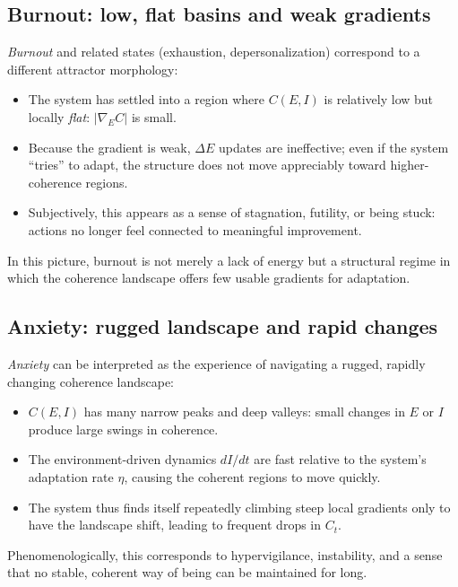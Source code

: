 \documentclass[12pt,a4paper]{report}
\begin{document}
\subsection*{Burnout: low, flat basins and weak gradients}

\emph{Burnout} and related states (exhaustion, depersonalization) correspond to a different attractor morphology:

\begin{itemize}[leftmargin=2em]
    \item The system has settled into a region where \(C(E, I)\) is relatively low but locally \emph{flat}: \(|\nabla_E C|\) is small.
    \item Because the gradient is weak, $\Delta E$ updates are ineffective; even if the system ``tries'' to adapt, the structure does not move appreciably toward higher-coherence regions.
    \item Subjectively, this appears as a sense of stagnation, futility, or being stuck: actions no longer feel connected to meaningful improvement.
\end{itemize}

In this picture, burnout is not merely a lack of energy but a structural regime in which the coherence landscape offers few usable gradients for adaptation.

\subsection*{Anxiety: rugged landscape and rapid changes}

\emph{Anxiety} can be interpreted as the experience of navigating a rugged, rapidly changing coherence landscape:

\begin{itemize}[leftmargin=2em]
    \item \(C(E, I)\) has many narrow peaks and deep valleys: small changes in \(E\) or \(I\) produce large swings in coherence.
    \item The environment-driven dynamics \(dI/dt\) are fast relative to the system's adaptation rate \(\eta\), causing the coherent regions to move quickly.
    \item The system thus finds itself repeatedly climbing steep local gradients only to have the landscape shift, leading to frequent drops in \(C_t\).
\end{itemize}

Phenomenologically, this corresponds to hypervigilance, instability, and a sense that no stable, coherent way of being can be maintained for long.
\end{document}
